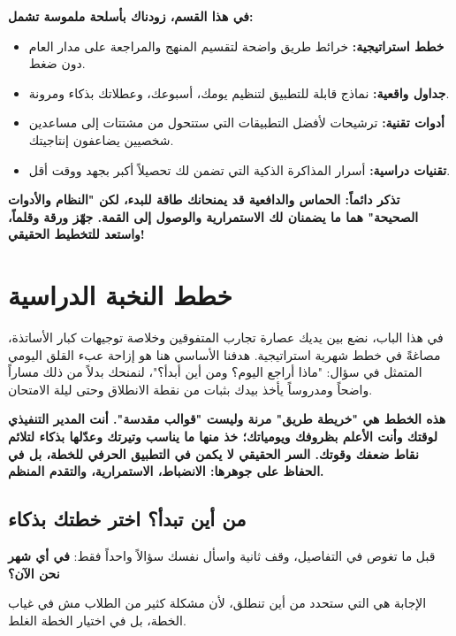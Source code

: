 \documentclass[12pt,a4paper]{book}
\newcommand{\importantAr}[1]{%
	\begin{important}
		\bfseries #1
	\end{important}
}
\begin{document}
	\textbf{في هذا القسم، زودناك بأسلحة ملموسة تشمل:}
	\begin{itemize}
		\item \textbf{خطط استراتيجية:} خرائط طريق واضحة لتقسيم المنهج والمراجعة على مدار العام دون ضغط.
		\item \textbf{جداول واقعية:} نماذج قابلة للتطبيق لتنظيم يومك، أسبوعك، وعطلاتك بذكاء ومرونة.
		\item \textbf{أدوات تقنية:} ترشيحات لأفضل التطبيقات التي ستتحول من مشتتات إلى مساعدين شخصيين يضاعفون إنتاجيتك.
		\item \textbf{تقنيات دراسية:} أسرار المذاكرة الذكية التي تضمن لك تحصيلاً أكبر بجهد ووقت أقل.
	\end{itemize}
	
	\importantAr{تذكر دائماً: \newline الحماس والدافعية قد يمنحانك طاقة للبدء، لكن "النظام والأدوات الصحيحة" هما ما يضمنان لك الاستمرارية والوصول إلى القمة. جهّز ورقة وقلماً، واستعد للتخطيط الحقيقي!}
	
	\chapter{خطط النخبة الدراسية}
	\label{chap:plans}
	
	
	في هذا الباب، نضع بين يديك عصارة تجارب المتفوقين وخلاصة توجيهات كبار الأساتذة، مصاغةً في خطط شهرية استراتيجية. هدفنا الأساسي هنا هو إزاحة عبء القلق اليومي المتمثل في سؤال: "ماذا أراجع اليوم؟ ومن أين أبدأ؟"، لنمنحك بدلاً من ذلك مساراً واضحاً ومدروساً يأخذ بيدك بثبات من نقطة الانطلاق وحتى ليلة الامتحان.
	
	\importantAr{هذه الخطط هي "خريطة طريق" مرنة وليست "قوالب مقدسة". أنت المدير التنفيذي لوقتك وأنت الأعلم بظروفك ويومياتك؛ خذ منها ما يناسب وتيرتك وعدّلها بذكاء لتلائم نقاط ضعفك وقوتك. السر الحقيقي لا يكمن في التطبيق الحرفي للخطة، بل في الحفاظ على جوهرها: الانضباط، الاستمرارية، والتقدم المنظم.}
	
	\section{من أين تبدأ؟ اختر خطتك بذكاء}
	\label{sec:owner-experiences6}
	
	قبل ما تغوص في التفاصيل، وقف ثانية واسأل نفسك سؤالاً واحداً فقط:
	\textbf{في أي شهر نحن الآن؟}
	
	الإجابة هي التي ستحدد من أين تنطلق، لأن مشكلة كثير من الطلاب
	مش في غياب الخطة، بل في اختيار الخطة الغلط.
	
\end{document}
